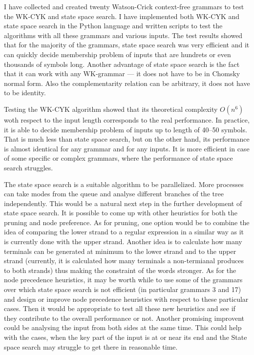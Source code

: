 I have collected and created twenty Watson-Crick context-free grammars to test the WK-CYK and state space search.
I have implemented both WK-CYK and state space search in the Python language and written scripts to test the algorithms with all these grammars and various inputs. The test results showed that for the majority of the grammars, state space search was very efficient and it can quickly decide membership problem of inputs that are hundrets or even thousands of symbols long. Another advantage of state space search is the fact that it can work with any WK-grammar --- it does not have to be in Chomsky normal form. Also the complementarity relation can be arbitrary, it does not have to be identity.

Testing the WK-CYK algorithm showed that its theoretical complexity $O(n^6)$ woth respect to the input length corresponds to the real performance. In practice, it is able to decide membership problem of inputs up to length of 40--50 symbols. That is much less than state space search, but on the other hand, its performance is almost identical for any grammar and for any inputs. It is more efficient in case of some specific or complex grammars, where the performance of state space search struggles.

The state space search is a suitable algorithm to be parallelized. More processes can take modes from the queue and analyse different branches of the tree independently. This would be a natural next step in the further development of state space search.
It is possible to come up with other heuristics for both the pruning and node preference. As for pruning, one option would be to combine the idea of comparing the lower strand to a regular expression in a similar way as it is currently done with the upper strand. Another idea is to calculate how many terminals can be generated at minimum to the lower strand and to the upper strand (currently, it is calculated how many terminals a non-termianal produces to both strands) thus making the constraint of the words stronger.
As for the node precedence heuristics, it may be worth while to use some of the grammars over which state space search is not efficient (in particular grammars 3 and 17) and design or improve node precedence heuristics with respect to these particular cases. Then it would be appropriate to test all these new heuristics and see if they contribute to the overall performance or not.
Another promising improvent could be analysing the input from both sides at the same time. This could help with the cases, when the key part of the input is at or near its end and the State space search may struggle to get there in reasonable time.
